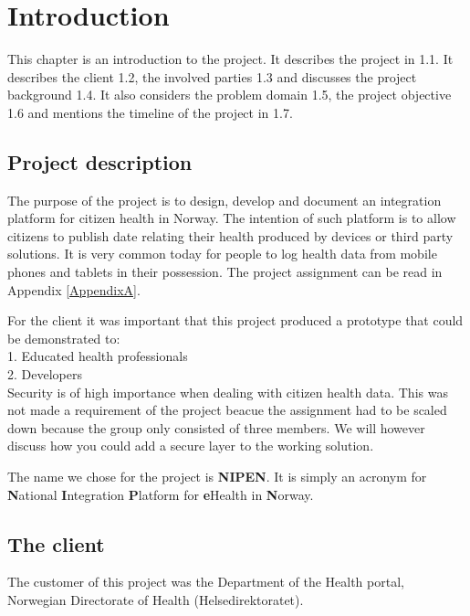 \chapter{Introduction} 
\label{Introduction} 

This chapter is an introduction to the project. 
It describes the project in 1.1. It describes the client 1.2, the involved parties 1.3 and discusses the project background 1.4. 
It also considers the problem domain 1.5, the project objective 1.6 and mentions the timeline of the project in 1.7.
\section{Project description}

The purpose of the project is to design, develop and document an integration platform for citizen health in Norway. 
The intention of such platform is to allow citizens to publish date relating their health produced by devices or third party solutions. 
It is very common today for people to log health data from mobile phones and tablets in their possession. The project assignment can be read in Appendix \ref{AppendixA}. 

For the client it was important that this project produced a prototype that could be demonstrated to: \\
1. Educated health professionals\\
2. Developers\\

Security is of high importance when dealing with citizen health data. This was not made a requirement of the project beacue the assignment had to be scaled down because the group only consisted of three members. 
We will however discuss how you could add a secure layer to the working solution. 

The name we chose for the project is \textbf{NIPEN}. It is simply an acronym for \textbf{N}ational \textbf{I}ntegration \textbf{P}latform for \textbf{e}Health in \textbf{N}orway.

\section{The client}

The customer of this project was the Department of the Health portal, Norwegian Directorate of Health (Helsedirektoratet).

